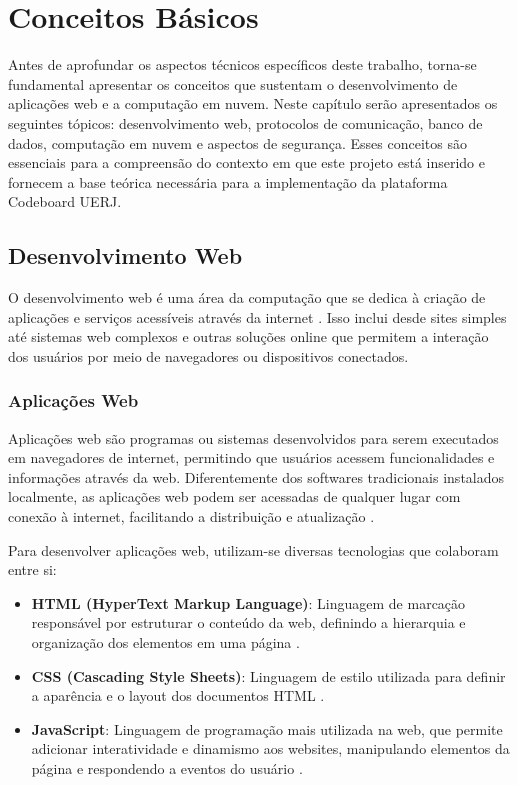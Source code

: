 \chapter{Conceitos Básicos}

Antes de aprofundar os aspectos técnicos específicos deste trabalho, torna-se fundamental apresentar os conceitos que sustentam o desenvolvimento de aplicações web e a computação em nuvem. Neste capítulo serão apresentados os seguintes tópicos: desenvolvimento web, protocolos de comunicação, banco de dados, computação em nuvem e aspectos de segurança. Esses conceitos são essenciais para a compreensão do contexto em que este projeto está inserido e fornecem a base teórica necessária para a implementação da plataforma Codeboard UERJ.

\section{Desenvolvimento Web}

O desenvolvimento web é uma área da computação que se dedica à criação de aplicações e serviços acessíveis através da internet \cite{web-development}. Isso inclui desde sites simples até sistemas web complexos e outras soluções online que permitem a interação dos usuários por meio de navegadores ou dispositivos conectados.

\subsection{Aplicações Web}


Aplicações web são programas ou sistemas desenvolvidos para serem executados em navegadores de internet, permitindo que usuários acessem funcionalidades e informações através da web. Diferentemente dos softwares tradicionais instalados localmente, as aplicações web podem ser acessadas de qualquer lugar com conexão à internet, facilitando a distribuição e atualização \cite{web-app}.

Para desenvolver aplicações web, utilizam-se diversas tecnologias que colaboram entre si:

\begin{itemize}
    \item \textbf{HTML (HyperText Markup Language)}: Linguagem de marcação responsável por estruturar o conteúdo da web, definindo a hierarquia e organização dos elementos em uma página \cite{html-mozilla}.
    \item \textbf{CSS (Cascading Style Sheets)}: Linguagem de estilo utilizada para definir a aparência e o layout dos documentos HTML \cite{meyer2006css}.
    \item \textbf{JavaScript}: Linguagem de programação mais utilizada na web, que permite adicionar interatividade e dinamismo aos websites, manipulando elementos da página e respondendo a eventos do usuário \cite{flanagan2020javascript}.
\end{itemize}

